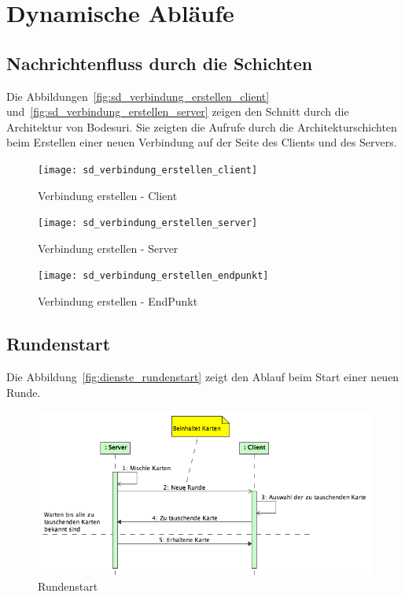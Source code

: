 \documentclass[12pt,halfparskip]{scrartcl}
\begin{document}
\clearpage
\section{Dynamische Abläufe} %
\label{dynamische_ablauefe}
\subsection{Nachrichtenfluss durch die Schichten} %
\label{sub:nachrichtenfluss_durch_die_schichten}
Die Abbildungen~\vref{fig:sd_verbindung_erstellen_client} und~\vref{fig:sd_verbindung_erstellen_server} zeigen den Schnitt durch die Architektur von Bodesuri. Sie zeigten die Aufrufe durch die Architekturschichten beim Erstellen einer neuen Verbindung auf der Seite des Clients und des Servers.
\begin{figure}[h]
	\centering
	\texttt{[image: sd\_verbindung\_erstellen\_client]}
	\caption{Verbindung erstellen - Client}
	\label{fig:sd_verbindung_erstellen_client}
\end{figure}
\begin{figure}[h]
	\centering
	\texttt{[image: sd\_verbindung\_erstellen\_server]}
	\caption{Verbindung erstellen - Server}
	\label{fig:sd_verbindung_erstellen_server}
\end{figure}

\begin{figure}[h]
	\centering
	\texttt{[image: sd\_verbindung\_erstellen\_endpunkt]}
	\caption{Verbindung erstellen - EndPunkt}
	\label{fig:sd_verbindung_erstellen_endpunkt}
\end{figure}


\subsection{Rundenstart} %
\label{sub:rundenstart}
Die Abbildung~\vref{fig:dienste_rundenstart} zeigt den Ablauf beim Start einer neuen Runde.
\begin{figure}[h]
	\centering
	\includegraphics[width=0.7 \textwidth]{dienste_rundenstart}
	\caption{Rundenstart}
	\label{fig:dienste_rundenstart}
\end{figure}
\end{document}
